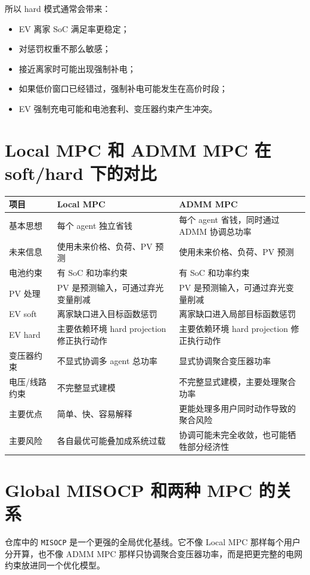 \documentclass[UTF8,zihao=-4]{ctexart}
\begin{document}
所以 hard 模式通常会带来：
\begin{itemize}
  \item EV 离家 SoC 满足率更稳定；
  \item 对惩罚权重不那么敏感；
  \item 接近离家时可能出现强制补电；
  \item 如果低价窗口已经错过，强制补电可能发生在高价时段；
  \item EV 强制充电可能和电池套利、变压器约束产生冲突。
\end{itemize}

\section{Local MPC 和 ADMM MPC 在 soft/hard 下的对比}

\begin{longtable}{p{3.1cm}p{5.7cm}p{5.7cm}}
\toprule
项目 & Local MPC & ADMM MPC \\
\midrule
\endhead
基本思想 & 每个 agent 独立省钱 & 每个 agent 省钱，同时通过 ADMM 协调总功率 \\
未来信息 & 使用未来价格、负荷、PV 预测 & 使用未来价格、负荷、PV 预测 \\
电池约束 & 有 SoC 和功率约束 & 有 SoC 和功率约束 \\
PV 处理 & PV 是预测输入，可通过弃光变量削减 & PV 是预测输入，可通过弃光变量削减 \\
EV soft & 离家缺口进入目标函数惩罚 & 离家缺口进入局部目标函数惩罚 \\
EV hard & 主要依赖环境 hard projection 修正执行动作 & 主要依赖环境 hard projection 修正执行动作 \\
变压器约束 & 不显式协调多 agent 总功率 & 显式协调聚合变压器功率 \\
电压/线路约束 & 不完整显式建模 & 不完整显式建模，主要处理聚合功率 \\
主要优点 & 简单、快、容易解释 & 更能处理多用户同时动作导致的聚合风险 \\
主要风险 & 各自最优可能叠加成系统过载 & 协调可能未完全收敛，也可能牺牲部分经济性 \\
\bottomrule
\end{longtable}

\section{Global MISOCP 和两种 MPC 的关系}

仓库中的 \texttt{MISOCP} 是一个更强的全局优化基线。它不像 Local MPC 那样每个用户分开算，也不像 ADMM MPC 那样只协调聚合变压器功率，而是把更完整的电网约束放进同一个优化模型。
\end{document}
